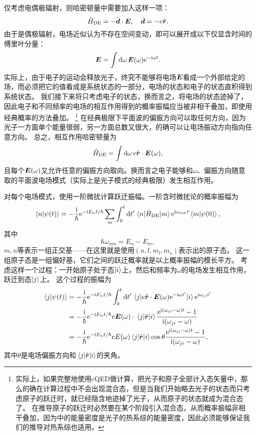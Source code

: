 \documentclass[UTF8, a4paper]{ctexart}
\newcommand*{\ee}{\mathrm{e}}
\newcommand*{\ii}{\mathrm{i}}
\renewcommand{\autoref}{\prettyref}
\begin{document}
仅考虑电偶极辐射，则哈密顿量中需要加入这样一项：
\begin{equation}
    \hat{H}_\text{DE} = - \hat{\vb*{d}} \cdot \vb*{E}, \quad \hat{\vb*{d}} = -e \hat{\vb*{r}}.
\end{equation}
由于是偶极辐射，电场近似认为不存在空间变动，即可以展开成以下仅显含时间的傅里叶分量：
\[
    \vb*{E} = \int \dd{\omega} \vb*{E}(\omega) \ee^{- \ii \omega t}.
\]
实际上，由于电子的运动会释放光子，终究不能够将电场$\vb*{E}$看成一个外部给定的场，而必须把它的值看成是系统状态的一部分，电场的状态和电子的状态直积得到系统状态。
我们接下来将只考虑电子的状态，换而言之，将电场的状态迹掉了，因此电子和不同频率的电场的相互作用得到的概率振幅应当被非相干叠加，即使用经典概率的方法叠加。%
\footnote{实际上，如果完整地使用cQED做计算，把光子和原子全部计入态矢量中，那么的确在计算过程中不会出现混合态，但是当我们开始略去光子的状态而只考虑原子的跃迁时，就已经隐含地迹掉了光子，从而原子的状态就成为混合态了。
在推导原子的跃迁时必然要在某个阶段引入混合态，从而概率振幅非相干叠加，因为\autoref{sec:einstein-phonomenon}中的能量密度是光子的热系综的能量密度，因此必须能够保证我们的推导对热系综也适用。}%
在经典极限下平面波的偏振方向可以取任何方向，因为光子一方面单个能量很弱，另一方面总数又很大，的确可以让电场振动方向指向任意方向。
总之，相互作用哈密顿量为
\[
    \hat{H}_\text{DE} = \int \dd{\omega} e \hat{\vb*{r}} \cdot \vb*{E}(\omega),
\]
且每个$\vb*{E}(\omega)$又允许任意的偏振方向取向。换而言之电子能够和$\omega$、偏振方向随意取的平面波电场模式（实际上是光子模式的经典极限）发生相互作用。

对每个电场模式，使用一阶微扰计算跃迁振幅。一阶含时微扰论的概率振幅为
\[
    \braket{n}{\psi(t)} = - \frac{\ii}{\hbar} \ee^{- \ii E_n t / \hbar} \sum_m \int_0^t \dd{t'} \mel{n}{\hat{H}_\text{DE}}{m} \ee^{\ii \omega_{nm} t} \braket{m}{\psi(0)},
\]
其中
\[
    \hbar \omega_{nm} = E_n - E_m,
\]
$m, n$等表示一组正交基——在这里就是使用$(n, l, m_l, m_s)$表示出的原子态。
这一组原子态是一组偏好基，它们之间的跃迁概率就是以上概率振幅的模长平方。
考虑这样一个过程：一开始原子处于态$\ket{i}$上，然后和频率为$\omega$的电场发生相互作用，跃迁到态$\ket{j}$上。
这个过程的振幅为
\[
    \begin{aligned}
        \braket{j}{\psi(t)} &= - \frac{\ii}{\hbar} \ee^{- \ii E_n t / \hbar} \int_0^t \dd{t'} \mel{j}{e \hat{\vb*{r}} \cdot \vb*{E}(\omega) \ee^{- \ii \omega t'}}{i} \ee^{\ii \omega_{ji} t'} \\
        &= - \frac{\ii}{\hbar} \ee^{- \ii E_n t / \hbar} e \vb*{E}(\omega) \cdot \mel{j}{\hat{\vb*{r}}}{i} \frac{\ee^{\ii (\omega_{ji} - \omega) t} - 1}{\ii (\omega_{ji} - \omega)} \\
        &= - \frac{\ii}{\hbar} \ee^{- \ii E_n t / \hbar} e E(\omega) \mel{j}{\hat{\vb*{r}}}{i} \cos \theta \frac{\ee^{\ii (\omega_{ji} - \omega) t} - 1}{\ii (\omega_{ji} - \omega)},
    \end{aligned}
\]
其中$\theta$是电场偏振方向和$\mel{j}{\hat{\vb*{r}}}{i}$的夹角。
\end{document}
